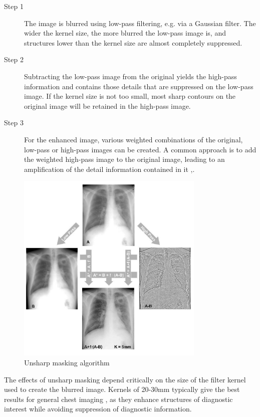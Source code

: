 \documentclass[nomenclature, english, bibtex]{kththesis}
\numberwithin{listing}{chapter}
\begin{document}
\begin{description}
    \item[Step 1] The image is blurred using low-pass filtering, e.g. via a Gaussian filter. The wider the kernel size,
    the more blurred the low-pass image is, and structures lower than the kernel size are almost completely suppressed.
    \item[Step 2] Subtracting the low-pass image from the original yields the high-pass information and contains those
    details that are suppressed on the low-pass image. If the kernel size is not too small, most sharp contours on the
    original image will be retained in the high-pass image.
    \item[Step 3] For the enhanced image, various weighted combinations of the original, low-pass or high-pass images
    can be created. A common approach is to add the weighted high-pass image to the original image, leading to an
    amplification of the detail information contained in it \cite[p.~152-153]{Prokop2003},.
\end{description}

\begin{figure}
    \centering
    \includegraphics[width=0.8\textwidth]{figures/unsharp_mask.png}
    \caption{Unsharp masking algorithm \cite[Figure~5]{Prokop2003}}
    \label{fig:unsharp_masking}
\end{figure}

The effects of unsharp masking depend critically on the size of the filter kernel used to create the blurred image.
Kernels of 20-30mm typically give the best results for general chest imaging \cite[p.~153]{Prokop2003},
as they enhance structures of diagnostic interest while avoiding suppression of diagnostic information.
\end{document}
